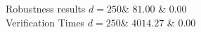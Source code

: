 
Robustness results
$d = 250$& $81.00$ & $0.00$\\

Verification Times
$d = 250$& $4014.27$ & $0.00$\\
